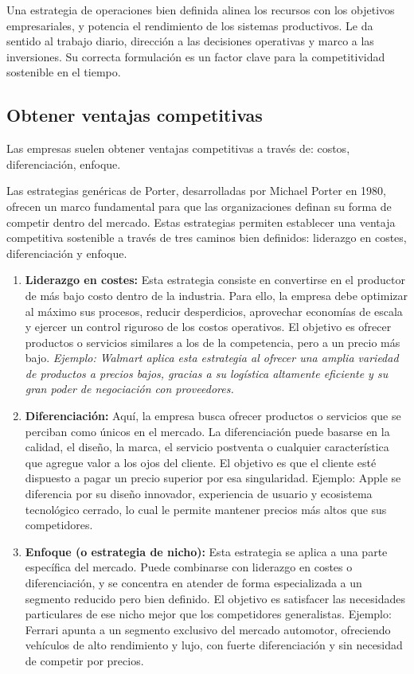 \documentclass[a4paper,oneside,11pt]{article}
\begin{document}
Una estrategia de operaciones bien definida alinea los recursos con los objetivos empresariales, y potencia el rendimiento de los sistemas productivos. Le da sentido al trabajo diario, dirección a las decisiones operativas y marco a las inversiones.
Su correcta formulación es un factor clave para la competitividad sostenible en el tiempo.

\subsection{Obtener ventajas competitivas}

Las empresas suelen obtener ventajas competitivas a través de: costos, diferenciación, enfoque.

Las estrategias genéricas de Porter, desarrolladas por Michael Porter en 1980, ofrecen un marco fundamental para que las organizaciones definan su forma de competir dentro del mercado. Estas estrategias permiten establecer una ventaja competitiva sostenible a través de tres caminos bien definidos: liderazgo en costes, diferenciación y enfoque.

\begin{enumerate}
    \item \colorbox{BurntOrange}{\textbf{Liderazgo en costes:}}
    Esta estrategia consiste en convertirse en el productor de más bajo costo dentro de la industria. Para ello, la empresa debe optimizar al máximo sus procesos, reducir desperdicios, aprovechar economías de escala y ejercer un control riguroso de los costos operativos. El objetivo es ofrecer productos o servicios similares a los de la competencia, pero a un precio más bajo.
    \textit{Ejemplo: Walmart aplica esta estrategia al ofrecer una amplia variedad de productos a precios bajos, gracias a su logística altamente eficiente y su gran poder de negociación con proveedores.}

    \item \colorbox{BurntOrange}{\textbf{Diferenciación:}}
    Aquí, la empresa busca ofrecer productos o servicios que se perciban como únicos en el mercado. La diferenciación puede basarse en la calidad, el diseño, la marca, el servicio postventa o cualquier característica que agregue valor a los ojos del cliente. El objetivo es que el cliente esté dispuesto a pagar un precio superior por esa singularidad.
    Ejemplo: Apple se diferencia por su diseño innovador, experiencia de usuario y ecosistema tecnológico cerrado, lo cual le permite mantener precios más altos que sus competidores.

    \item \colorbox{BurntOrange}{\textbf{Enfoque (o estrategia de nicho):}}
    Esta estrategia se aplica a una parte específica del mercado. Puede combinarse con liderazgo en costes o diferenciación, y se concentra en atender de forma especializada a un segmento reducido pero bien definido. El objetivo es satisfacer las necesidades particulares de ese nicho mejor que los competidores generalistas.
    Ejemplo: Ferrari apunta a un segmento exclusivo del mercado automotor, ofreciendo vehículos de alto rendimiento y lujo, con fuerte diferenciación y sin necesidad de competir por precios. 
\end{enumerate}
\end{document}
